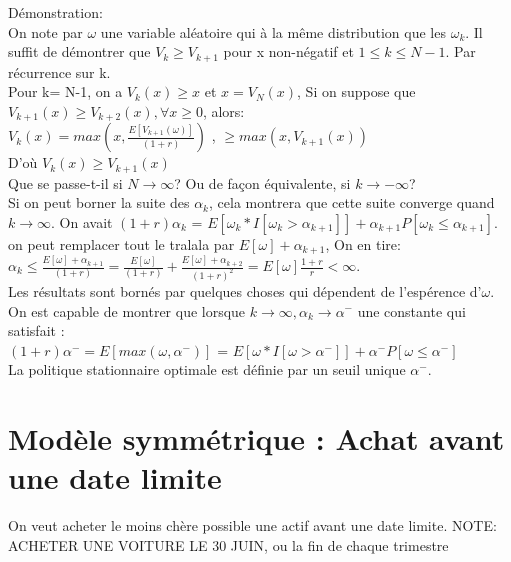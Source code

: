 \documentclass[oneside]{book}
\begin{document}
Démonstration:\\
On note par $\omega$ une variable aléatoire qui à la même distribution que les $\omega_k$. Il suffit de démontrer que $V_k \geq V_{k+1}$ pour x non-négatif et $1 \leq k \leq N-1$. Par récurrence sur k.\\

Pour k= N-1, on a $V_k(x) \geq x$ et $x = V_N(x)$, Si on suppose que $V_{k+1}(x) \geq V_{k+2}(x), \forall x\geq 0$, alors:\\

$V_k(x) = max(x, \frac{E[V_{k+1}(\omega)]}{(1+r)})$ , $\geq max(x, V_{k+1}(x))$\\

D'où $V_k(x) \geq V_{k+1}(x)$\\

Que se passe-t-il si $N \rightarrow \infty$? Ou de façon équivalente, si $k \rightarrow -\infty$?\\

Si on peut borner la suite des $\alpha_k$, cela montrera que cette suite converge quand $k \rightarrow \infty$. On avait $(1+r)\alpha_k$ = $E[\omega_k*I[\omega_k >  \alpha_{k+1}]] + \alpha_{k+1}P[\omega_k \leq \alpha_{k+1}]$. on peut remplacer tout le tralala par $E[\omega]+\alpha_{k+1}$, On en tire:\\

$\alpha_k \leq \frac{E[\omega] + \alpha_{k+1}}{(1+r)} = \frac{E[\omega]}{(1+r)} + \frac{E[\omega] + \alpha_{k+2}}{(1+r)^2} = E[\omega]\frac{1+r}{r} < \infty$.\\

Les résultats sont bornés par quelques choses qui dépendent de l'espérence d'$\omega$. On est capable de montrer que lorsque $k \rightarrow \infty, \alpha_k \rightarrow \alpha^-$ une constante qui satisfait :\\

\centering
$(1+r)\alpha^- =  E[max(\omega, \alpha^-)]$  = $E[\omega * I[\omega > \alpha^-]] + \alpha^-P[\omega \leq \alpha^-]$\\

\justify
La politique stationnaire optimale est définie par un seuil unique $\alpha^-$.\\

\section{Modèle symmétrique : Achat avant une date limite}
On veut acheter le moins chère possible une actif avant une date limite. NOTE: ACHETER UNE VOITURE LE 30 JUIN, ou la fin de chaque trimestre\\
\end{document}
